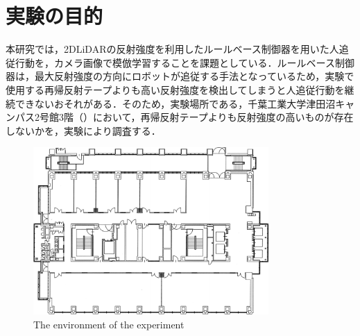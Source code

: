 
\section{実験の目的}

  本研究では，2DLiDARの反射強度を利用したルールベース制御器を用いた人追従行動を，カメラ画像で模倣学習することを課題としている．ルールベース制御器は，最大反射強度の方向にロボットが追従する手法となっているため，実験で使用する再帰反射テープよりも高い反射強度を検出してしまうと人追従行動を継続できないおそれがある．そのため，実験場所である，千葉工業大学津田沼キャンパス2号館3階（）において，再帰反射テープよりも反射強度の高いものが存在しないかを，実験により調査する．

\vspace{2cm}

  \begin{figure}[h]
    \centering
    \includegraphics[width=9cm] {images/pdf/RobotGuidance_cit3f}
    \captionsetup{justification=raggedright} %
    \caption{The environment of the experiment}
    \label{Fig:RobotGuidance_cit3f}
  \end{figure}

\newpage
